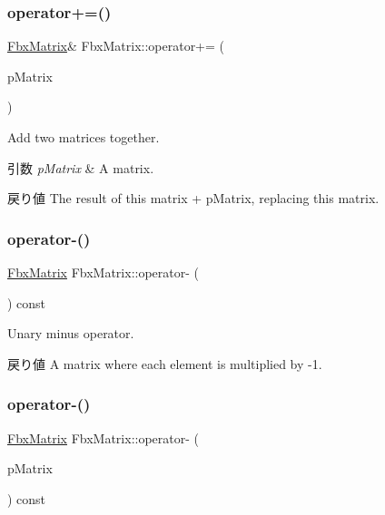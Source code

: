 \subsubsection{\texorpdfstring{operator+=()}{operator+=()}}
{\footnotesize\ttfamily \hyperlink{class_fbx_matrix}{Fbx\+Matrix}\& Fbx\+Matrix\+::operator+= (\begin{DoxyParamCaption}\item[{const \hyperlink{class_fbx_matrix}{Fbx\+Matrix} \&}]{p\+Matrix }\end{DoxyParamCaption})}

Add two matrices together. 
\begin{DoxyParams}{引数}
{\em p\+Matrix} & A matrix. \\
\hline
\end{DoxyParams}
\begin{DoxyReturn}{戻り値}
The result of this matrix + p\+Matrix, replacing this matrix. 
\end{DoxyReturn}
\mbox{\label{class_fbx_matrix_a598bafa12879f9f233d8b5524ebdaad2}} 
\subsubsection{\texorpdfstring{operator-\/()}{operator-()}\hspace{0.1cm}{\footnotesize\ttfamily [1/2]}}
{\footnotesize\ttfamily \hyperlink{class_fbx_matrix}{Fbx\+Matrix} Fbx\+Matrix\+::operator-\/ (\begin{DoxyParamCaption}{ }\end{DoxyParamCaption}) const}

Unary minus operator. \begin{DoxyReturn}{戻り値}
A matrix where each element is multiplied by -\/1. 
\end{DoxyReturn}
\mbox{\label{class_fbx_matrix_a5a8209e3a84baf3961be72e9e7fa5c69}} 
\subsubsection{\texorpdfstring{operator-\/()}{operator-()}\hspace{0.1cm}{\footnotesize\ttfamily [2/2]}}
{\footnotesize\ttfamily \hyperlink{class_fbx_matrix}{Fbx\+Matrix} Fbx\+Matrix\+::operator-\/ (\begin{DoxyParamCaption}\item[{const \hyperlink{class_fbx_matrix}{Fbx\+Matrix} \&}]{p\+Matrix }\end{DoxyParamCaption}) const}

